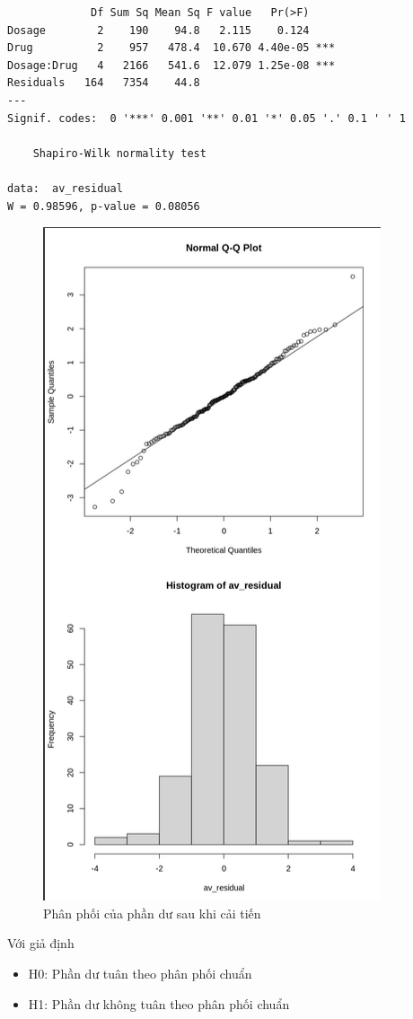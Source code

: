 \begin{lstlisting}
             Df Sum Sq Mean Sq F value   Pr(>F)    
Dosage        2    190    94.8   2.115    0.124    
Drug          2    957   478.4  10.670 4.40e-05 ***
Dosage:Drug   4   2166   541.6  12.079 1.25e-08 ***
Residuals   164   7354    44.8                     
---
Signif. codes:  0 '***' 0.001 '**' 0.01 '*' 0.05 '.' 0.1 ' ' 1

	Shapiro-Wilk normality test

data:  av_residual
W = 0.98596, p-value = 0.08056
\end{lstlisting}
\begin{figure}[H]
    \centering
    \includegraphics[width=0.7\linewidth]{part01_figures/21.png}
    \caption{Phân phối của phần dư sau khi cải tiến}
    \label{fig:Phân phối của phần dư sau khi cải tiến}
\end{figure}
Với giả định \begin{itemize}
    \item H0: Phần dư tuân theo phân phối chuẩn
    \item H1: Phần dư không tuân theo phân phối chuẩn
\end{itemize}

